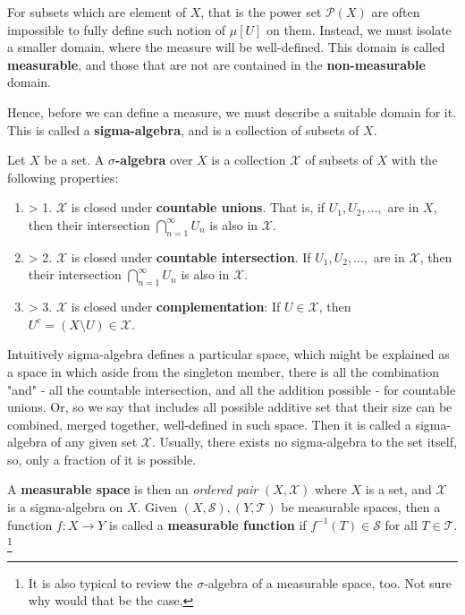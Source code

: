 For subsets which are element of $X$, that is the power set $\mathcal{P}(X)$ are often impossible to fully define such notion of $\mu[U]$ on them. Instead, we must isolate a smaller domain, where the measure will be well-defined. This domain is called \textbf{measurable}, and those that are not are contained in the \textbf{non-measurable} domain. 

Hence, before we can define a measure, we must describe a suitable domain for it. This is called a \textbf{sigma-algebra}, and is a collection of subsets of $X$. 

\begin{definition}
    Let $X$ be a set. A \textbf{$\sigma$-algebra} over $X$ is a collection $\mathcal{X}$ of subsets of $X$ with the following properties: 
    \begin{enumerate}
        \item > 1. $\mathcal{X}$ is closed under \textbf{countable unions}. That is, if $U_{1},U_{2},\dots,$ are in $X$, then their intersection $\displaystyle{\bigcap^{\infty}_{n=1}U_{n}}$ is also in $\mathcal{X}$. 
        \item > 2. $\mathcal{X}$ is closed under \textbf{countable intersection}. If $U_{1},U_{2},\dots,$ are in $\mathcal{X}$, then their intersection $\displaystyle{\bigcap^{\infty}_{n=1}U_{n}}$ is also in $\mathcal{X}$. 
        \item > 3. $\mathcal{X}$ is closed under \textbf{complementation}: If $U\in \mathcal{X}$, then $U^{c}=(X\setminus U)\in\mathcal{X}$. 
    \end{enumerate}
\end{definition}

Intuitively sigma-algebra defines a particular space, which might be explained as a space in which aside from the singleton member, there is all the combination "and" - all the countable intersection, and all the addition possible - for countable unions. Or, so we say that includes all possible additive set that their size can be combined, merged together, well-defined in such space. Then it is called a sigma-algebra of any given set $\mathcal{X}$. Usually, there exists no sigma-algebra to the set itself, so, only a fraction of it is possible. 

A \textbf{measurable space} is then an \textit{ordered pair} $(X,\mathcal{X})$ where $X$ is a set, and $\mathcal{X}$ is a sigma-algebra on $X$. Given $(X,\mathcal{S}),(Y,\mathcal{T})$ be measurable spaces, then a function $f:X\longrightarrow Y$ is called a \textbf{measurable function} if $f^{-1}(T)\in \mathcal{S}$ for all $T\in \mathcal{T}$. \footnote{It is also typical to review the $\sigma$-algebra of a measurable space, too. Not sure why would that be the case.}

